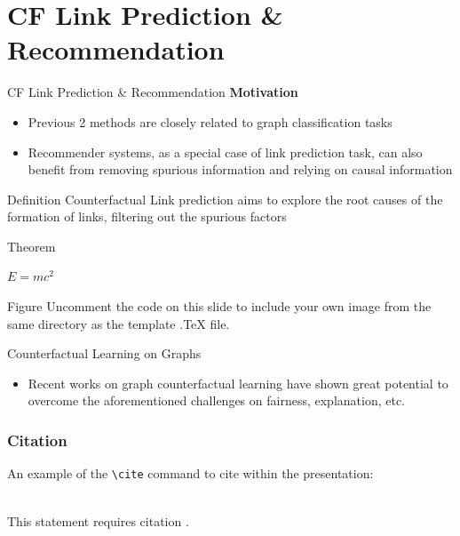 \documentclass[aspectratio=169,xcolor=dvipsnames]{beamer}
\begin{document}
	\section{CF Link Prediction \& Recommendation}
	\begin{frame}{CF Link Prediction \& Recommendation}
		\textbf{Motivation}
		\begin{itemize}
			\item Previous 2 methods are closely related to graph classification tasks
			\item Recommender systems, as a special case of link prediction task, can also benefit from removing spurious information and relying on causal information
		\end{itemize}
		\begin{block}{Definition}
			Counterfactual Link prediction aims to explore the root causes of the formation of links, filtering out the spurious factors
		\end{block}
	\end{frame}
	
	
	\begin{frame}{Theorem}
		\begin{theorem}
			$E = mc^2$
		\end{theorem}
	\end{frame}
	
	
	\begin{frame}{Figure}
		Uncomment the code on this slide to include your own image from the same directory as the template .TeX file.
	\end{frame}
	
	
	

	\begin{frame}{Counterfactual Learning on Graphs}
		\begin{itemize}
			\item Recent works on graph counterfactual learning have shown great potential to overcome the aforementioned challenges 	on fairness, explanation, etc.
		\end{itemize}
	\end{frame}
	
	\begin{frame}[fragile] %
		\frametitle{Citation}
		An example of the \verb|\cite| command to cite within the presentation:\\~
		
		This statement requires citation \cite{p1}.
	\end{frame}
	
\end{document}
